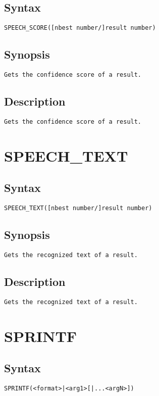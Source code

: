 \subsection{Syntax}
\begin{verbatim}
SPEECH_SCORE([nbest number/]result number)
\end{verbatim}
\subsection{Synopsis}
\begin{verbatim}
Gets the confidence score of a result.
\end{verbatim}
\subsection{Description}
\begin{verbatim}
Gets the confidence score of a result.

\end{verbatim}


\section{SPEECH\_TEXT}
\subsection{Syntax}
\begin{verbatim}
SPEECH_TEXT([nbest number/]result number)
\end{verbatim}
\subsection{Synopsis}
\begin{verbatim}
Gets the recognized text of a result.
\end{verbatim}
\subsection{Description}
\begin{verbatim}
Gets the recognized text of a result.

\end{verbatim}


\section{SPRINTF}
\subsection{Syntax}
\begin{verbatim}
SPRINTF(<format>|<arg1>[|...<argN>])
\end{verbatim}
